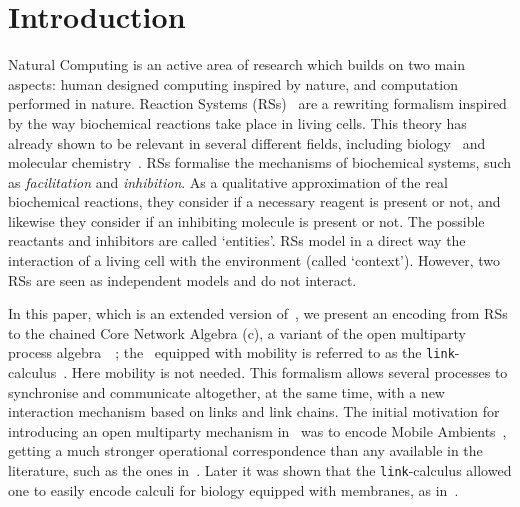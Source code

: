 
\section{Introduction}

Natural Computing is an active area of research which builds on two main 
aspects: human designed computing inspired by nature, and computation 
performed in nature. Reaction Systems (RSs)~\cite{BEMR11} are 
a rewriting formalism
inspired by the way biochemical reactions take place in living 
cells.  
This theory has already shown to be relevant in several different 
fields, 
including biology~\cite{ABP14,CMMBM12,Az17,BarbutiGLM16}
and molecular chemistry~\cite{OY16}.
RSs formalise the mechanisms of biochemical systems, 
such as {\em facilitation} and {\em inhibition}. 
As a qualitative approximation of the real biochemical reactions, they
consider if a necessary reagent is present or not, and likewise they
consider if an inhibiting molecule is present or not. 
The  possible reactants and inhibitors are called `entities'.
RSs model in a direct way the interaction of a living cell
with the environment (called `context'). However, two RSs are seen
as independent models and do not interact.


In this paper, which is an extended version of~\cite{BBF19},
we present an encoding
from RSs
to the chained Core Network  Algebra (c\CNA), a variant of the 
 open multiparty process algebra~\CNA~\cite{BBB17}; the \CNA~equipped with mobility is referred to as the {\tt link}-calculus~\cite{BodeiBB12,BODEI2020104587}.
 Here mobility is not needed.
This formalism allows several processes to synchronise and 
communicate altogether, at the same time, with a new interaction
mechanism based on links and link chains. 
The initial motivation for introducing
an open multiparty mechanism in~\cite{BodeiBB12}
was to encode
Mobile Ambients~\cite{CardelliG00}, getting a much stronger operational
correspondence than any available in the literature, such as the ones in~\cite{CZ07,B16}.
Later it was shown that the {\tt link}-calculus allowed one to easily encode calculi for biology equipped with membranes, as in~\cite{BodeiBBC14}.

